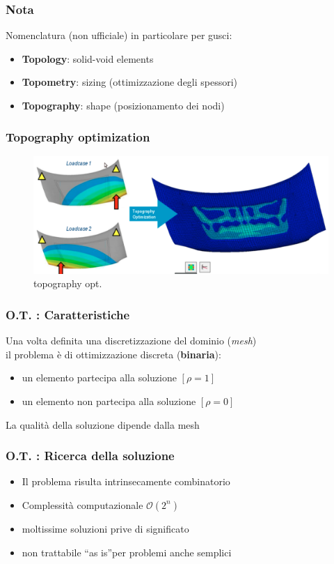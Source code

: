 \documentclass{beamer}
\begin{document}
\begin{frame}
	\frametitle{Nota}
	Nomenclatura (non ufficiale) in particolare per gusci: \\
	\begin{itemize}
		\item \textbf{Topology}: solid-void elements
		\item \textbf{Topometry}: sizing (ottimizzazione degli spessori)
		\item \textbf{Topography}: shape (posizionamento dei nodi)
	\end{itemize}
\end{frame}

\begin{frame}
	\frametitle{Topography optimization}
	\begin{figure}
		\includegraphics[width=0.9\linewidth]{./images/topography.png}
		\caption{topography opt.}
		\label{fig:topography}
	\end{figure}	
\end{frame}

\begin{frame}
	\frametitle{O.T. : Caratteristiche}
	Una volta definita una discretizzazione del dominio (\textit{mesh}) \\ il problema \`{e} di ottimizzazione discreta (\textbf{binaria}):
	\begin{itemize}
		\item un elemento partecipa alla soluzione $[\rho=1]$
		\item un elemento non partecipa alla soluzione $[\rho=0]$
	\end{itemize}
	La qualit\`{a} della soluzione dipende dalla mesh
\end{frame}


\begin{frame}
	\frametitle{O.T. : Ricerca della soluzione}
	\begin{itemize}
		\item Il problema risulta intrinsecamente combinatorio
		\item Complessit\`{a} computazionale $\mathcal{O}(2^n)$
		\item moltissime soluzioni prive di significato
		\item non trattabile \textquotedblleft as is\textquotedblright per problemi anche semplici
	\end{itemize}
\end{frame}
\end{document}
